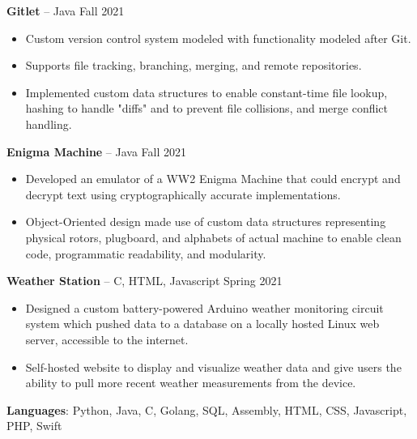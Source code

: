 \documentclass{article}
\begin{document}
    \vspace{2mm}

    \textbf{Gitlet} -- Java \hfill Fall 2021 
    \begin{itemize}
        \item Custom version control system modeled with functionality modeled after Git.
        \item Supports file tracking, branching, merging, and remote repositories.
        \item Implemented custom data structures to enable constant-time file lookup, hashing to handle "diffs" and to prevent file collisions, and merge conflict handling.
    \end{itemize}

    \vspace{2mm}

    \noindent \textbf{Enigma Machine} -- Java \hfill Fall 2021
    \begin{itemize}
        \item Developed an emulator of a WW2 Enigma Machine that could encrypt and decrypt text using cryptographically accurate implementations.
        \item Object-Oriented design made use of custom data structures representing physical rotors, plugboard, and alphabets of actual machine to enable clean code, programmatic readability, and modularity.
    \end{itemize} 

    \vspace{2mm}

    \noindent \textbf{Weather Station} -- C, HTML, Javascript \hfill Spring 2021
    \begin{itemize}
        \item Designed a custom battery-powered Arduino weather monitoring circuit system which pushed data to a database on a locally hosted Linux web server, accessible to the internet. 
        \item Self-hosted website to display and visualize weather data and give users the ability to pull more recent weather measurements from the device.
    \end{itemize}

    \vspace{-2mm}


    \noindent \textbf{Languages}: Python, Java, C, Golang, SQL, Assembly, HTML, CSS, Javascript, PHP, Swift
    
\end{document}
